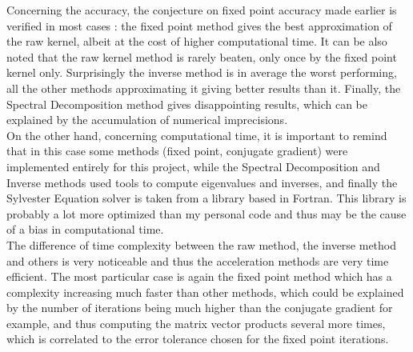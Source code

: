 \documentclass{article}
\theoremstyle{definition}
\begin{document}
Concerning the accuracy, the conjecture on fixed point accuracy made earlier is verified in most cases : the fixed point method gives the best approximation of the raw kernel, albeit at the cost of higher computational time. It can be also noted that the raw kernel method is rarely beaten, only once by the fixed point kernel only. Surprisingly the inverse method is in average the worst performing, all the other methods approximating it giving better results than it. Finally, the Spectral Decomposition method gives disappointing results, which can be explained by the accumulation of numerical imprecisions.\\
On the other hand, concerning computational time, it is important to remind that in this case some methods (fixed point, conjugate gradient) were implemented entirely for this project, while the Spectral Decomposition and Inverse methods used tools to compute eigenvalues and inverses, and finally the Sylvester Equation solver is taken from a library based in Fortran. This library is probably a lot more optimized than my personal code and thus may be the cause of a bias in computational time.\\
The difference of time complexity between the raw method, the inverse method and others is very noticeable and thus the acceleration methods are very time efficient. The most particular case is again the fixed point method which has a complexity increasing much faster than other methods, which could be explained by the number of iterations being much higher than the conjugate gradient for example, and thus computing the matrix vector products several more times, which is correlated to the error tolerance chosen for the fixed point iterations.
\end{document}
